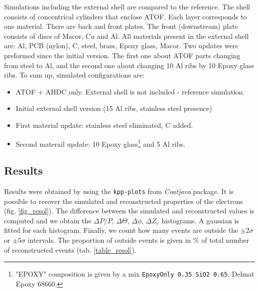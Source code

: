 \documentclass[11pt,a4paper,english]{article}
\begin{document}
	Simulations including the external shell are compared to the reference. The shell consists of concentrical cylinders that enclose ATOF. Each layer corresponds to one material. There are back and front plates. The front (downstream) plate consists of discs of Macor, Cu and Al. All materials present in the external shell are: Al, PCB (nylon), C, steel, brass, Epoxy glass, Macor. Two updates were preformed since the initial version. The first one about ATOF parts changing from steel to Al, and the second one about changing 10 Al ribs by 10 Epoxy glass ribs. 
	To sum up, simulated configurations are:
	\begin{itemize}
		\item ATOF + AHDC only. External shell is not included - reference simulation.
		\item Initial external shell version (15 Al ribs, stainless steel presence)
		\item First material update: stainless steel eliminated, C added.
		\item Second materail update: 10 Epoxy glass\footnote{"EPOXY" composition is given by a mix \texttt{EpoxyOnly 0.35 SiO2 0.65}. Delmat Epoxy 68660.} and 5 Al ribs.
	\end{itemize}

	\subsection{Results}
Results were obtained by using the \texttt{kpp-plots} from \textit{Coatjava} package. It is possible to recover the simulated and reconstructed properties of the electrons (fig. \ref{fig_resol}).
The difference between the simulated and reconstructed values is computed and we obtain the  $\Delta P / P$, $\Delta \Theta$, $\Delta \phi$, $\Delta Z_v$ histograms. A gaussian is fitted for each histogram. Finally, we count how many events are outside the $\pm 2\sigma$ or $\pm 5\sigma$ intervals. The proportion of outside events is given in \% of total number of reconstructed events (tab. \ref{table_resol}).
\end{document}
